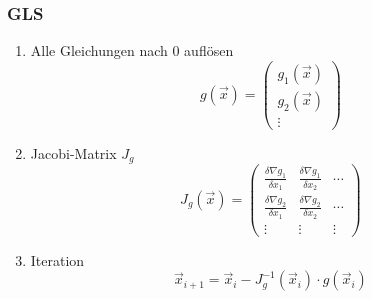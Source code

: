 \subsubsection*{GLS}
\begin{enumerate}

	\item Alle Gleichungen nach 0 auflösen
	\begin{displaymath}
		g(\vec{x}) =
		\begin{pmatrix}
			g_1(\vec{x}) \\
			g_2(\vec{x}) \\
			\vdots
		\end{pmatrix}
	\end{displaymath}
	
	\item Jacobi-Matrix $J_g$
	\begin{displaymath}
		J_g(\vec{x}) =
		\begin{pmatrix}
			\frac{\delta \nabla g_1}{\delta x_1}  & \frac{\delta \nabla g_1}{\delta x_2} & \cdots \\[5pt]
			\frac{\delta \nabla g_2}{\delta x_1}  & \frac{\delta \nabla g_2}{\delta x_2} & \cdots \\
			\vdots & \vdots & \vdots
		\end{pmatrix}
	\end{displaymath}
	
	\item Iteration
	\begin{displaymath}
		\vec{x}_{i+1} = \vec{x}_i - J_g^{-1}(\vec{x}_i) \cdot g(\vec{x}_i)
	\end{displaymath}

\end{enumerate}




